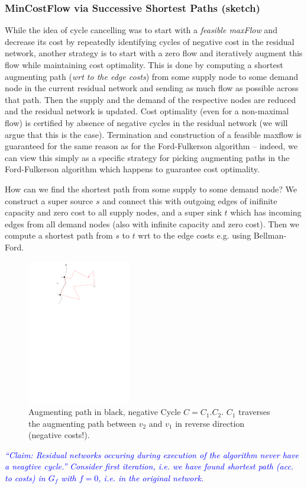 \documentclass{article}
\begin{document}
\subsubsection{MinCostFlow via Successive Shortest Paths (sketch)}
While the idea of cycle cancelling was to start with a \emph{feasible maxFlow} and decrease its cost by repeatedly identifying cycles of negative cost in the residual network, another strategy is to start with a zero flow and iteratively augment this flow while maintaining cost optimality. This is done by computing a  shortest augmenting path (\emph{wrt to the edge costs}) from some supply node to some demand node in the current residual network and sending as much flow as possible across that path. Then the supply and the demand of the respective nodes are reduced and the residual network is updated.
 Cost optimality (even for a non-maximal flow) is certified by absence of negative cycles in the residual network (we will argue that this is the case). Termination and construction of a feasible maxflow is guaranteed for the same reason as for the Ford-Fulkerson algorithm -- indeed, we can view this simply as a specific strategy for picking augmenting paths in the Ford-Fulkerson algorithm which happens to guarantee cost optimality.
 
How can we find the shortest path from some supply to some demand node? We construct a super source $s$ and connect this with outgoing edges of inifinite capacity and zero cost to all supply nodes, and a super sink $t$ which has incoming edges from all demand nodes (also with infinite capacity and zero cost). Then we compute a shortest path from $s$ to $t$ wrt to the edge costs e.g. using Bellman-Ford. 

\begin{figure}
\centering
\includegraphics[width=0.4\textwidth]{Figs/SSP-noNegCyc.pdf}
\caption{Augmenting path in black, negative Cycle $C=C_1.C_2$. $C_1$ traverses the augmenting path between $v_2$ and $v_1$ in reverse direction (negative costs!).}\label{fig:SSPnoNegCyc}
\end{figure}
\textcolor{blue}{\emph{"`Claim: Residual networks occuring during execution of the algorithm never have a neagtive cycle."'}}
\textcolor{blue}{\emph{Consider first iteration, i.e. we have found shortest path (acc. to costs) in $G_f$ with $f=0$, i.e. in the original network.}}
\end{document}
